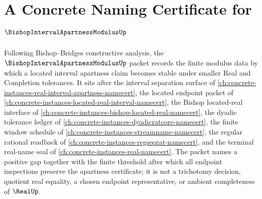\chapter{A Concrete Naming Certificate for $\BishopIntervalApartnessModulusUp$}
\label{ch:concrete-instances-bishop-interval-apartness-modulus-namecert}

Following Bishop--Bridges constructive analysis, the $\BishopIntervalApartnessModulusUp$ packet records the finite modulus data by which a located interval apartness claim becomes stable under smaller Real and Completion tolerances. It sits after the interval separation surface of \autoref{ch:concrete-instances-real-interval-apartness-namecert}, the located endpoint packet of \autoref{ch:concrete-instances-located-real-interval-namecert}, the Bishop located-real interface of \autoref{ch:concrete-instances-bishop-located-real-namecert}, the dyadic tolerance ledger of \autoref{ch:concrete-instances-dyadicratcore-namecert}, the finite window schedule of \autoref{ch:concrete-instances-streamname-namecert}, the regular rational readback of \autoref{ch:concrete-instances-regseqrat-namecert}, and the terminal real-name seal of \autoref{ch:concrete-instances-real-namecert}. The packet names a positive gap together with the finite threshold after which all endpoint inspections preserve the apartness certificate; it is not a trichotomy decision, quotient real equality, a chosen endpoint representative, or ambient completeness of $\RealUp$.

